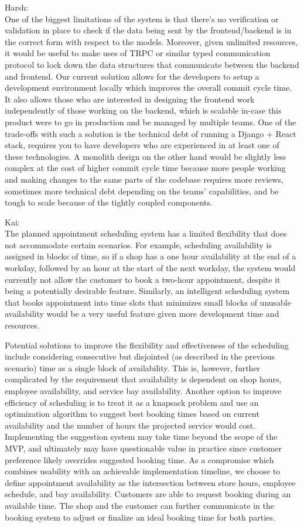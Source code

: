 \documentclass[12pt, titlepage]{article}
\begin{document}
Harsh:\\
One of the biggest limitations of the system is that there's no verification or validation in place to check if the data being sent by the frontend/backend is in the correct form with respect to the models. Moreover, given unlimited resources, it would be useful to make uses of TRPC or similar typed communication protocol to lock down the data structures that communicate between the backend and frontend.
Our current solution allows for the developers to setup a development environment locally which improves the overall commit cycle time. It also allows those who are interested in designing the frontend work independently of those working on the backend, which is scalable in-case this product were to go in production and be managed by multiple teams. One of the trade-offs with such a solution is the technical debt of running a Django + React stack, requires you to have developers who are experienced in at least one of these technologies. A monolith design on the other hand would be slightly less complex at the cost of higher commit cycle time because more people working and making changes to the same parts of the codebase requires more reviews, sometimes more technical debt depending on the teams' capabilities, and be tough to scale because of the tightly coupled components.
 
Kai:\\
The planned appointment scheduling system has a limited flexibility that does not accommodate certain scenarios. For example, scheduling availability is assigned in blocks of time, so if a shop has a one hour availability at the end of a workday, followed by an hour at the start of the next workday, the system would currently not allow the customer to book a two-hour appointment, despite it being a potentially desirable feature. Similarly, an intelligent scheduling system that books appointment into time slots that minimizes small blocks of unusable availability would be a very useful feature given more development time and resources.

Potential solutions to improve the flexibility and effectiveness of the scheduling include considering consecutive but disjointed (as described in the previous scenario) time as a single block of availability. This is, however, further complicated by the requirement that availability is dependent on shop hours, employee availability, and service bay availability. Another option to improve efficiency of scheduling is to treat it as a knapsack problem and use an optimization algorithm to suggest best booking times based on current availability and the number of hours the projected service would cost. Implementing the suggestion system may take time beyond the scope of the MVP, and ultimately may have questionable value in practice since customer preference likely overrides suggested booking time. As a compromise which combines usability with an achievable implementation timeline, we choose to define appointment availability as the intersection between store hours, employee schedule, and bay availability. Customers are able to request booking during an available time. The shop and the customer can further communicate in the booking system to adjust or finalize an ideal booking time for both parties.
\end{document}
